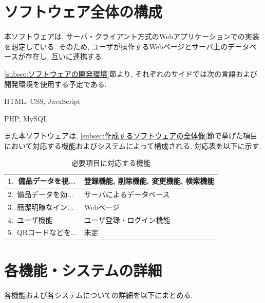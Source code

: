 \documentclass[11ptm]{jsarticle}
\begin{document}
\section{ソフトウェア全体の構成}
\label{sec:ソフトウェア全体の構成}
本ソフトウェアは, サーバ・クライアント方式のWebアプリケーションでの実装を想定している. そのため, ユーザが操作するWebページとサーバ上のデータベースが存在し, 互いに連携する. \par
\ref{subsec:ソフトウェアの開発環境}節より, それぞれのサイドでは次の言語および開発環境を使用する予定である.
\begin{description}[labelwidth=15em]
  \item[クライアントサイド(Webページ)] HTML, CSS, JavaScript
  \item[サーバサイド] PHP, MySQL
\end{description}
また本ソフトウェアは, \ref{subsec:作成するソフトウェアの全体像}節で挙げた項目において対応する機能およびシステムによって構成される. 対応表を以下に示す.
\begin{table}[h]
  \caption{必要項目に対応する機能}
  \label{tb:必要項目に対応する機能}
  \centering
  \begin{tabularx}{\linewidth}{l|l}
    1.\ 備品データを視... & 登録機能, 削除機能, 変更機能, 検索機能 \\
    \hline
    2.\ 備品データを効... & サーバによるデータベース             \\
    \hline
    3.\ 簡潔明瞭なイン... & Webページ                              \\
    \hline
    4.\ ユーザ機能      & ユーザ登録・ログイン機能             \\
    \hline
    5.\ QRコードなどを... & 未定                                   \\
  \end{tabularx}
\end{table}


\newpage
\section{各機能・システムの詳細}
\label{sec:各機能の詳細・システムの詳細}
各機能および各システムについての詳細を以下にまとめる.

\end{document}
